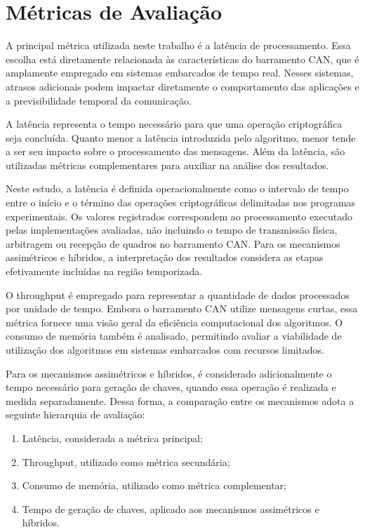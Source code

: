 \section{Métricas de Avaliação}

A principal métrica utilizada neste trabalho é a latência de processamento. Essa escolha está diretamente relacionada às características do barramento CAN, que é amplamente empregado em sistemas embarcados de tempo real. Nesses sistemas, atrasos adicionais podem impactar diretamente o comportamento das aplicações e a previsibilidade temporal da comunicação.

A latência representa o tempo necessário para que uma operação criptográfica seja concluída. Quanto menor a latência introduzida pelo algoritmo, menor tende a ser seu impacto sobre o processamento das mensagens. Além da latência, são utilizadas métricas complementares para auxiliar na análise dos resultados.

Neste estudo, a latência é definida operacionalmente como o intervalo de tempo entre o início e o término das operações criptográficas delimitadas nos programas experimentais. Os valores registrados correspondem ao processamento executado pelas implementações avaliadas, não incluindo o tempo de transmissão física, arbitragem ou recepção de quadros no barramento CAN. Para os mecanismos assimétricos e híbridos, a interpretação dos resultados considera as etapas efetivamente incluídas na região temporizada.

O throughput é empregado para representar a quantidade de dados processados por unidade de tempo. Embora o barramento CAN utilize mensagens curtas, essa métrica fornece uma visão geral da eficiência computacional dos algoritmos. O consumo de memória também é analisado, permitindo avaliar a viabilidade de utilização dos algoritmos em sistemas embarcados com recursos limitados.

Para os mecanismos assimétricos e híbridos, é considerado adicionalmente o tempo necessário para geração de chaves, quando essa operação é realizada e medida separadamente. Dessa forma, a comparação entre os mecanismos adota a seguinte hierarquia de avaliação:

\begin{enumerate}
    \item Latência, considerada a métrica principal;
    \item Throughput, utilizado como métrica secundária;
    \item Consumo de memória, utilizado como métrica complementar;
    \item Tempo de geração de chaves, aplicado aos mecanismos assimétricos e híbridos.
\end{enumerate}

